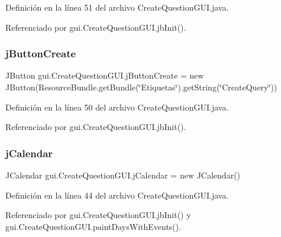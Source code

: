 Definición en la línea 51 del archivo Create\+Question\+G\+U\+I.\+java.



Referenciado por gui.\+Create\+Question\+G\+U\+I.\+jb\+Init().

\mbox{\label{classgui_1_1CreateQuestionGUI_ab63c4d45270efeffdb0137a8be0163bb}} 
\subsubsection{\texorpdfstring{jButtonCreate}{jButtonCreate}}
{\footnotesize\ttfamily J\+Button gui.\+Create\+Question\+G\+U\+I.\+j\+Button\+Create = new J\+Button(Resource\+Bundle.\+get\+Bundle(\char`\"{}Etiquetas\char`\"{}).get\+String(\char`\"{}Create\+Query\char`\"{}))\hspace{0.3cm}{\ttfamily [private]}}



Definición en la línea 50 del archivo Create\+Question\+G\+U\+I.\+java.



Referenciado por gui.\+Create\+Question\+G\+U\+I.\+jb\+Init().

\mbox{\label{classgui_1_1CreateQuestionGUI_a8f04ad9ee4441b9a1bd2f8aedcddeadb}} 
\subsubsection{\texorpdfstring{jCalendar}{jCalendar}}
{\footnotesize\ttfamily J\+Calendar gui.\+Create\+Question\+G\+U\+I.\+j\+Calendar = new J\+Calendar()\hspace{0.3cm}{\ttfamily [private]}}



Definición en la línea 44 del archivo Create\+Question\+G\+U\+I.\+java.



Referenciado por gui.\+Create\+Question\+G\+U\+I.\+jb\+Init() y gui.\+Create\+Question\+G\+U\+I.\+paint\+Days\+With\+Events().

\mbox{\label{classgui_1_1CreateQuestionGUI_a7cba1213dbc064173f83408ee9348354}} 
